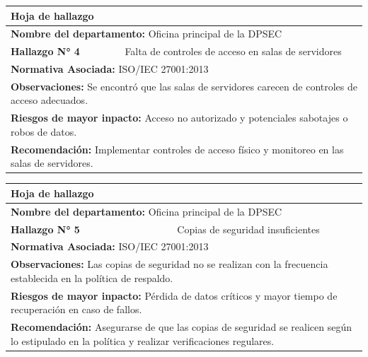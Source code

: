 \documentclass[12pt,a4paper]{article}
\begin{document}
    \par
    \begin{tabular}{ |p{4cm}|p{4cm}|p{4cm}|  }
        \hline  
        \multicolumn{3}{|l|}{\textbf{Hoja de hallazgo}} \\
        \hline
        \multicolumn{3}{|l|}{\textbf{Nombre del departamento: } Oficina principal de la DPSEC} \\
        \hline
        \textbf{Hallazgo N° 4}  & \multicolumn{2}{|c|}{ Falta de controles de acceso en salas de servidores } \\
        \hline
        \multicolumn{3}{|l|}{\textbf{Normativa Asociada: } ISO/IEC 27001:2013 } \\
        \hline
        \multicolumn{3}{|l|}{\textbf{Observaciones: } Se encontró que las salas de servidores carecen de controles de acceso adecuados.} \\
        \hline
        \multicolumn{3}{|l|}{\textbf{Riesgos de mayor inpacto: } Acceso no autorizado y potenciales sabotajes o robos de datos. } \\
        \hline
        \multicolumn{3}{|l|}{\textbf{Recomendación: } Implementar controles de acceso físico y monitoreo en las salas de servidores. } \\
        \hline
    \end{tabular}
    \par
    \begin{tabular}{ |p{4cm}|p{4cm}|p{4cm}|  }
        \hline  
        \multicolumn{3}{|l|}{\textbf{Hoja de hallazgo}} \\
        \hline
        \multicolumn{3}{|l|}{\textbf{Nombre del departamento: } Oficina principal de la DPSEC} \\
        \hline
        \textbf{Hallazgo N° 5}  & \multicolumn{2}{|c|}{ Copias de seguridad insuficientes } \\
        \hline
        \multicolumn{3}{|l|}{\textbf{Normativa Asociada: }  ISO/IEC 27001:2013 } \\
        \hline
        \multicolumn{3}{|l|}{\textbf{Observaciones: } Las copias de seguridad no se realizan con la frecuencia establecida en la política de respaldo.} \\
        \hline
        \multicolumn{3}{|l|}{\textbf{Riesgos de mayor inpacto: } Pérdida de datos críticos y mayor tiempo de recuperación en caso de fallos. } \\
        \hline
        \multicolumn{3}{|l|}{\textbf{Recomendación: } Asegurarse de que las copias de seguridad se realicen según lo estipulado en la política y realizar verificaciones regulares.

        } \\
        \hline
    \end{tabular}
\end{document}
